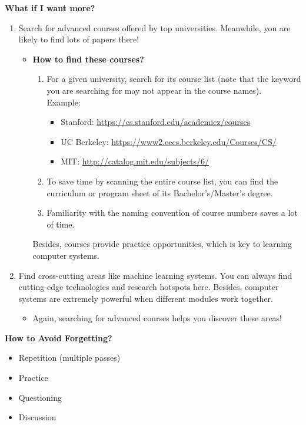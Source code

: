 \documentclass{article}
\begin{document}
\noindent
\textbf{What if I want more?}
\begin{enumerate}
    \item Search for advanced courses offered by top universities.
    Meanwhile, you are likely to find lots of papers there!
    \begin{itemize}
        \item \textbf{How to find these courses?}
        \begin{enumerate}
            \item For a given university, search for its course list (note that the keyword you are searching for may not appear in the course names).\\
            Example:
            \begin{itemize}
                \item Stanford:
                \href{https://cs.stanford.edu/academicz/courses}{https://cs.stanford.edu/academicz/courses}
                \item UC Berkeley:
                \href{https://www2.eecs.berkeley.edu/Courses/CS/}{https://www2.eecs.berkeley.edu/Courses/CS/}
                \item MIT:
                \href{http://catalog.mit.edu/subjects/6/}{http://catalog.mit.edu/subjects/6/}
            \end{itemize}
            \item To save time by scanning the entire course list, you can find the curriculum or program sheet of its Bachelor's/Master's degree.
            \item Familiarity with the naming convention of course numbers saves a lot of time.
        \end{enumerate}
        Besides, courses provide practice opportunities, which is key to learning computer systems.
    \end{itemize}
    
    \item Find cross-cutting areas like machine learning systems.
    You can always find cutting-edge technologies and research hotspots here.
    Besides, computer systems are extremely powerful when different modules work together.
    \begin{itemize}
        \item Again, searching for advanced courses helps you discover these areas!
    \end{itemize}
\end{enumerate}

\noindent
\textbf{How to Avoid Forgetting?}
\begin{itemize}
    \item Repetition (multiple passes)
    \item Practice
    \item Questioning
    \item Discussion
\end{itemize}
\end{document}
